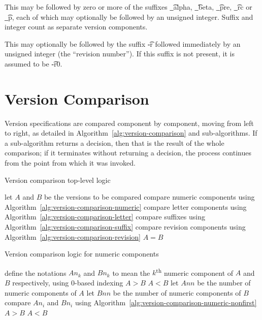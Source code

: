 This may be followed by zero or more of the suffixes \t{_alpha}, \t{_beta}, \t{_pre}, \t{_rc}
or \t{_p}, each of which may optionally be followed by an unsigned integer. Suffix and integer
count as separate version components.

This may optionally be followed by the suffix \t{-r} followed immediately by an unsigned integer
(the ``revision number''). If this suffix is not present, it is assumed to be \t{-r0}.

\section{Version Comparison}

Version specifications are compared component by component, moving from left to right,
as detailed in Algorithm~\ref{alg:version-comparison} and sub-algorithms.
If a sub-algorithm returns a decision, then that is the result of the whole comparison;
if it terminates without returning a decision, the process continues from the point
from which it was invoked.

\begin{algorithm}[p]
\caption{Version comparison top-level logic} \label{alg:version-comparison}
\begin{algorithmic}[1]
    \STATE let $A$ and $B$ be the versions to be compared
    \STATE compare numeric components using Algorithm~\ref{alg:version-comparison-numeric}
    \STATE compare letter components using Algorithm~\ref{alg:version-comparison-letter}
    \STATE compare suffixes using Algorithm~\ref{alg:version-comparison-suffix}
    \STATE compare revision components using Algorithm~\ref{alg:version-comparison-revision}
    \RETURN $A=B$
\end{algorithmic}
\end{algorithm}

\begin{algorithm}[p]
\caption{Version comparison logic for numeric components} \label{alg:version-comparison-numeric}
\begin{algorithmic}[1]
  \STATE define the notations $An_k$ and $Bn_k$ to mean the $k$\textsuperscript{th} numeric
      component of $A$ and $B$ respectively, using $0$-based indexing
    \RETURN $A>B$
    \RETURN $A<B$
  \ENDIF
  \STATE let $Ann$ be the number of numeric components of $A$
  \STATE let $Bnn$ be the number of numeric components of $B$
    \STATE compare $An_i$ and $Bn_i$ using Algorithm~\ref{alg:version-comparison-numeric-nonfirst}
  \ENDFOR
    \RETURN $A>B$
    \RETURN $A<B$
  \ENDIF
\end{algorithmic}
\end{algorithm}

